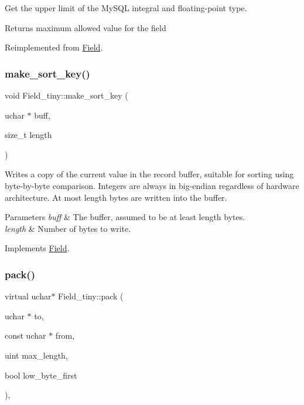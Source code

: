 Get the upper limit of the My\+S\+QL integral and floating-\/point type.

\begin{DoxyReturn}{Returns}
maximum allowed value for the field 
\end{DoxyReturn}


Reimplemented from \mbox{\hyperlink{classField_a22f18fbe3224a5ac4f23a90523b09087}{Field}}.

\mbox{\label{classField__tiny_aed9f16f6c316ed9335f9b09febfce864}} 
\subsubsection{\texorpdfstring{make\+\_\+sort\+\_\+key()}{make\_sort\_key()}}
{\footnotesize\ttfamily void Field\+\_\+tiny\+::make\+\_\+sort\+\_\+key (\begin{DoxyParamCaption}\item[{uchar $\ast$}]{buff,  }\item[{size\+\_\+t}]{length }\end{DoxyParamCaption})\hspace{0.3cm}{\ttfamily [virtual]}}

Writes a copy of the current value in the record buffer, suitable for sorting using byte-\/by-\/byte comparison. Integers are always in big-\/endian regardless of hardware architecture. At most length bytes are written into the buffer.


\begin{DoxyParams}{Parameters}
{\em buff} & The buffer, assumed to be at least length bytes.\\
\hline
{\em length} & Number of bytes to write. \\
\hline
\end{DoxyParams}


Implements \mbox{\hyperlink{classField_af3bc27d237b6ae6ef3dc7a2aec3d79ac}{Field}}.

\mbox{\label{classField__tiny_ac3326a980428d393cd52d821578f87d7}} 
\subsubsection{\texorpdfstring{pack()}{pack()}}
{\footnotesize\ttfamily virtual uchar$\ast$ Field\+\_\+tiny\+::pack (\begin{DoxyParamCaption}\item[{uchar $\ast$}]{to,  }\item[{const uchar $\ast$}]{from,  }\item[{uint}]{max\+\_\+length,  }\item[{bool}]{low\+\_\+byte\+\_\+first }\end{DoxyParamCaption})\hspace{0.3cm}{\ttfamily [inline]}, {\ttfamily [virtual]}}


